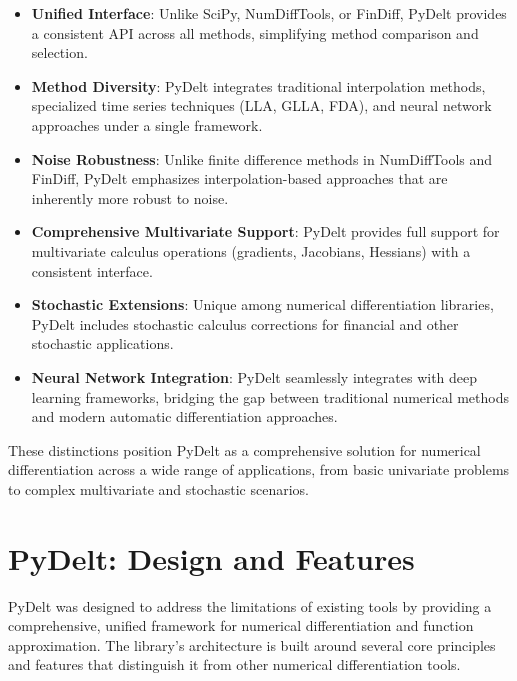 \documentclass[11pt,a4paper]{article}
\begin{document}
\begin{itemize}
    \item \textbf{Unified Interface}: Unlike SciPy, NumDiffTools, or FinDiff, PyDelt provides a consistent API across all methods, simplifying method comparison and selection.
    
    \item \textbf{Method Diversity}: PyDelt integrates traditional interpolation methods, specialized time series techniques (LLA, GLLA, FDA), and neural network approaches under a single framework.
    
    \item \textbf{Noise Robustness}: Unlike finite difference methods in NumDiffTools and FinDiff, PyDelt emphasizes interpolation-based approaches that are inherently more robust to noise.
    
    \item \textbf{Comprehensive Multivariate Support}: PyDelt provides full support for multivariate calculus operations (gradients, Jacobians, Hessians) with a consistent interface.
    
    \item \textbf{Stochastic Extensions}: Unique among numerical differentiation libraries, PyDelt includes stochastic calculus corrections for financial and other stochastic applications.
    
    \item \textbf{Neural Network Integration}: PyDelt seamlessly integrates with deep learning frameworks, bridging the gap between traditional numerical methods and modern automatic differentiation approaches.
\end{itemize}

These distinctions position PyDelt as a comprehensive solution for numerical differentiation across a wide range of applications, from basic univariate problems to complex multivariate and stochastic scenarios.

\section{PyDelt: Design and Features}

PyDelt was designed to address the limitations of existing tools by providing a comprehensive, unified framework for numerical differentiation and function approximation. The library's architecture is built around several core principles and features that distinguish it from other numerical differentiation tools.
\end{document}
